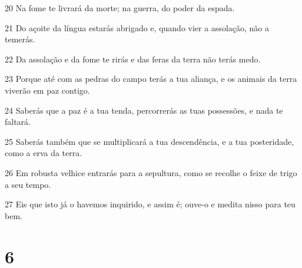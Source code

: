 \par 20 Na fome te livrará da morte; na guerra, do poder da espada.
\par 21 Do açoite da língua estarás abrigado e, quando vier a assolação, não a temerás.
\par 22 Da assolação e da fome te rirás e das feras da terra não terás medo.
\par 23 Porque até com as pedras do campo terás a tua aliança, e os animais da terra viverão em paz contigo.
\par 24 Saberás que a paz é a tua tenda, percorrerás as tuas possessões, e nada te faltará.
\par 25 Saberás também que se multiplicará a tua descendência, e a tua posteridade, como a erva da terra.
\par 26 Em robusta velhice entrarás para a sepultura, como se recolhe o feixe de trigo a seu tempo.
\par 27 Eis que isto já o havemos inquirido, e assim é; ouve-o e medita nisso para teu bem.

\chapter{6}

